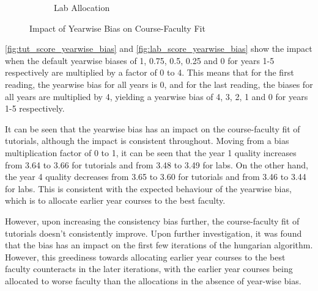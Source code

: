 \begin{figure}[H]
\begin{subfigure}[h]{0.4\linewidth}
    \caption{Lab Allocation}
    \label{fig:lab_score_yearwise_bias}
  \end{subfigure}
  \caption{Impact of Yearwise Bias on Course-Faculty Fit}
\end{figure}

\autoref{fig:tut_score_yearwise_bias} and \autoref{fig:lab_score_yearwise_bias} show the impact when the default yearwise biases of 1, 0.75, 0.5, 0.25 and 0 for years 1-5 respectively are multiplied by a factor of 0 to 4. This means that for the first reading, the yearwise bias for all years is 0, and for the last reading, the biases for all years are multiplied by 4, yielding a yearwise bias of 4, 3, 2, 1 and 0 for years 1-5 respectively.

It can be seen that the yearwise bias has an impact on the course-faculty fit of tutorials, although the impact is consistent throughout. Moving from a bias multiplication factor of 0 to 1, it can be seen that the year 1 quality increases from 3.64 to 3.66 for tutorials and from 3.48 to 3.49 for labs. On the other hand, the year 4 quality decreases from 3.65 to 3.60 for tutorials and from 3.46 to 3.44 for labs. This is consistent with the expected behaviour of the yearwise bias, which is to allocate earlier year courses to the best faculty.

However, upon increasing the consistency bias further, the course-faculty fit of tutorials doesn't consistently improve. Upon further investigation, it was found that the bias has an impact on the first few iterations of the hungarian algorithm. However, this greediness towards allocating earlier year courses to the best faculty counteracts in the later iterations, with the earlier year courses being allocated to worse faculty than the allocations in the absence of year-wise bias.

